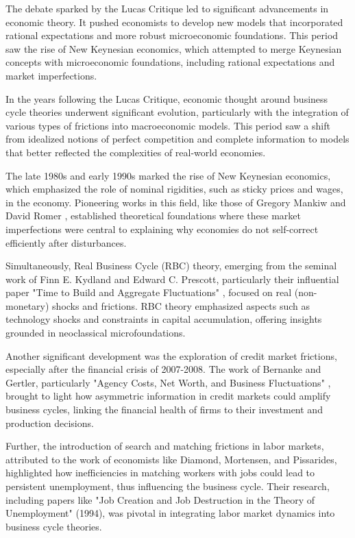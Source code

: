 \documentclass[12pt]{article}
\begin{document}
The debate sparked by the Lucas Critique led to significant advancements in economic theory. It pushed economists to
develop new models that incorporated rational expectations and more robust microeconomic foundations. This period saw
the rise of New Keynesian economics, which attempted to merge Keynesian concepts with microeconomic foundations,
including rational expectations and market imperfections. 

In the years following the Lucas Critique, economic thought around business cycle theories underwent significant
evolution, particularly with the integration of various types of frictions into macroeconomic models. This period saw a
shift from idealized notions of perfect competition and complete information to models that better reflected the
complexities of real-world economies. 

The late 1980s and early 1990s marked the rise of New Keynesian economics, which emphasized the role of nominal
rigidities, such as sticky prices and wages, in the economy. Pioneering works in this field, like those of Gregory
Mankiw and David Romer \cite{ManRom91}, established theoretical foundations where these market imperfections were central to explaining
why economies do not self-correct efficiently after disturbances.  

Simultaneously, Real Business Cycle (RBC) theory, emerging from the seminal work of Finn E. Kydland and Edward C.
Prescott, particularly their influential paper "Time to Build and Aggregate Fluctuations" \cite{Pre82}, focused on real
(non-monetary) shocks and frictions. RBC theory emphasized aspects such as technology shocks and constraints in capital
accumulation, offering insights grounded in neoclassical microfoundations. 

Another significant development was the exploration of credit market frictions, especially after the financial crisis of
2007-2008. The work of Bernanke and Gertler, particularly "Agency Costs, Net Worth, and Business Fluctuations" \cite{BerGer86},
brought to light how asymmetric information in credit markets could amplify business cycles, linking the financial
health of firms to their investment and production decisions. 

Further, the introduction of search and matching frictions in labor markets, attributed to the work of economists like
Diamond, Mortensen, and Pissarides, highlighted how inefficiencies in matching workers with jobs could lead to
persistent unemployment, thus influencing the business cycle. Their research, including papers like "Job Creation and
Job Destruction in the Theory of Unemployment" (1994)\cite{MorDalPisChr94}, was pivotal in integrating labor market dynamics into business
cycle theories. 
\end{document}
